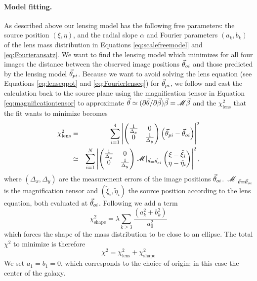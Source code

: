 \paragraph{Model fitting.} As described above our lensing model has the following free parameters: the source position $(\xi,\eta)$, and the radial slope $\alpha$ and Fourier parameters $(a_k,b_k)$ of the lens mass distribution in Equations \ref{eq:scalefreemodel} and \ref{eq:Fourieransatz}. We want to find the lensing model which minimizes for all four images the distance between the observed image positions $\vec{\theta}_{oi}$ and those predicted by the lensing model $\vec{\theta}_{pi}$. Because we want to avoid solving the lens equation (see Equations \ref{eq:lenseqpot} and \ref{eq:Fourierlenseq}) for $\vec{\theta}_{pi}$, we follow \citet{1991ApJ...373..354K} and cast the calculation back to the source plane using the magnification tensor in Equation \ref{eq:magnificationtensor} to approximate $\vec{\theta} \simeq (\partial \vec{\theta} / \partial \vec{\beta}) \vec{\beta} = \mathscr{M} \vec{\beta} $ and the $\chi^2_\text{lens}$ that the fit wants to minimize becomes
\begin{eqnarray*}
\chi^2_\text{lens} &=& \sum_{i=1}^{4} \left|\left( \begin{matrix} \frac{1}{\Delta_x} & 0\\0 & \frac{1}{\Delta_y}\end{matrix}\right) \left( \vec{\theta}_{pi} - \vec{\theta}_{oi} \right)\right|^2\\
&\simeq& \sum_{i=1}^{N} \left|\left( \begin{matrix} \frac{1}{\Delta_x} & 0\\0 & \frac{1}{\Delta_y}\end{matrix}\right)  \left.\mathscr{M}\right|_{\vec{\theta}=\vec{\theta}_{oi}} \left( \begin{matrix} \xi - \tilde{\xi}_i \\ \eta - \tilde{\eta}_i \end{matrix} \right) \right|^2,
\end{eqnarray*}
where $(\Delta_x,\Delta_y)$ are the measurement errors of the image positions $\vec{\theta}_{oi}$. $\left.\mathscr{M}\right|_{\vec{\theta}=\vec{\theta}_{oi}}$ is the magnification tensor and $(\tilde{\xi}_i,\tilde{\eta}_i)$ the source position according to the lens equation, both evaluated at $\vec{\theta}_{oi}$. Following \citet{GlennEC} we add a term
\begin{equation*}
\chi^2_\text{shape} = \lambda \sum_{k \geq 3} \frac{\left(a_k^2 +b_k^2 \right)}{a_0^2} 
\end{equation*}
which forces the shape of the mass distribution to be close to an ellipse. The total $\chi^2$ to minimize is therefore
\begin{equation*}
\chi^2 = \chi^2_\text{lens} + \chi^2_\text{shape}
\end{equation*}
We set $a_1 = b_1 = 0$, which corresponds to the choice of origin; in this case the center of the galaxy.

